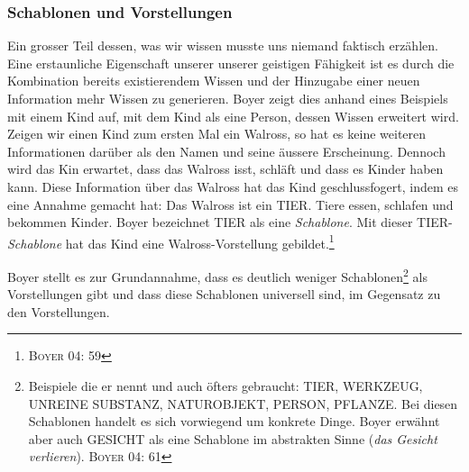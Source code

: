 \subsubsection*{Schablonen und Vorstellungen}
Ein grosser Teil dessen, was wir wissen musste uns niemand faktisch erzählen. Eine erstaunliche Eigenschaft unserer unserer geistigen Fähigkeit ist es durch die Kombination bereits existierendem Wissen und der Hinzugabe einer neuen Information mehr Wissen zu generieren. Boyer zeigt dies anhand eines Beispiels mit einem Kind auf, mit dem Kind als eine Person, dessen Wissen erweitert wird. Zeigen wir einen Kind zum ersten Mal ein Walross, so hat es keine weiteren Informationen darüber als den Namen und seine äussere Erscheinung. Dennoch wird das Kin erwartet, dass das Walross isst, schläft und dass es Kinder haben kann. Diese Information über das Walross hat das Kind geschlussfogert, indem es eine Annahme gemacht hat: Das Walross ist ein TIER. Tiere essen, schlafen und bekommen Kinder. Boyer bezeichnet TIER als eine \emph{Schablone}. Mit dieser TIER-\emph{Schablone} hat das Kind eine Walross-Vorstellung gebildet.\footnote{\textsc{Boyer 04: 59}}   

Boyer stellt es zur Grundannahme, dass es deutlich weniger Schablonen\footnote{Beispiele die er nennt und auch öfters gebraucht: TIER, WERKZEUG, UNREINE SUBSTANZ, NATUROBJEKT, PERSON, PFLANZE. Bei diesen Schablonen handelt es sich vorwiegend um konkrete Dinge. Boyer erwähnt aber auch GESICHT als eine Schablone im abstrakten Sinne (\emph{das Gesicht verlieren}). \textsc{Boyer 04: 61}} als Vorstellungen gibt und dass diese Schablonen universell sind, im Gegensatz zu den Vorstellungen. 

